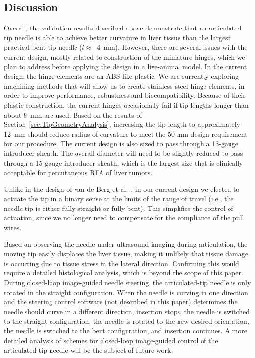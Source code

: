 \subsection{Discussion}
\label{sec:ArticDiscussion}
Overall, the validation results described above demonstrate that an articulated-tip needle is able to achieve better curvature in liver tissue than the largest practical bent-tip needle ($l \approx$~4~mm). However, there are several issues with the current design, mostly related to construction of the miniature hinges, which we plan to address before applying the design in a live-animal model. In the current design, the hinge elements are an ABS-like plastic. We are currently exploring machining methods that will allow us to create stainless-steel hinge elements, in order to improve performance, robustness and biocompatibility. Because of their plastic construction, the current hinges occasionally fail if tip lengths longer than about 9~mm are used. Based on the results of Section~\ref{sec:TipGeometryAnalysis}, increasing the tip length to approximately 12~mm should reduce radius of curvature to meet the 50-mm design requirement for our procedure. The current design is also sized to pass through a 13-gauge introducer sheath. The overall diameter will need to be slightly reduced to pass through a 15-gauge introducer sheath, which is the largest size that is clinically acceptable for percutaneous RFA of liver tumors.

Unlike in the design of van de Berg et al.~\cite{vandeBerg2015}, in our current design we elected to actuate the tip in a binary sense at the limits of the range of travel (i.e., the needle tip is either fully straight or fully bent). This simplifies the control of actuation, since we no longer need to compensate for the compliance of the pull wires. 

Based on observing the needle under ultrasound imaging during articulation, the moving tip easily displaces the liver tissue, making it unlikely that tissue damage is occurring due to tissue stress in the lateral direction. Confirming this would require a detailed histological analysis, which is beyond the scope of this paper. During closed-loop image-guided needle steering, the articulated-tip needle is only rotated in the straight configuration. When the needle is curving in one direction and the steering control software (not described in this paper) determines the needle should curve in a different direction, insertion stops, the needle is switched to the straight configuration, the needle is rotated to the new desired orientation, the needle is switched to the bent configuration, and insertion continues. A more detailed analysis of schemes for closed-loop image-guided control of the articulated-tip needle will be the subject of future work.

